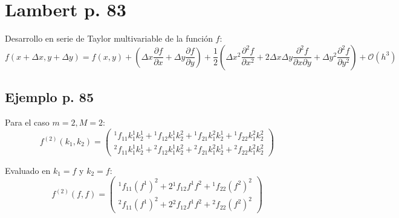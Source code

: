 \newpage

\section*{Lambert p. 83}

Desarrollo en serie de Taylor multivariable de la función $f$:
$$ f(x+\Delta x, y+\Delta y) = f(x,y) + \left(\Delta x \frac{\partial f}{\partial x} + \Delta y \frac{\partial f}{\partial y}\right) + \frac{1}{2}\left(\Delta x^2 \frac{\partial^2 f}{\partial x^2} + 2\Delta x \Delta y \frac{\partial^2 f}{\partial x \partial y} + \Delta y^2 \frac{\partial^2 f}{\partial y^2}\right) + \mathcal{O}(h^3) $$

\subsection*{Ejemplo p. 85}
Para el caso $m=2, M=2$:
$$ f^{(2)}(k_1, k_2) = \begin{pmatrix} 
    {^1}f_{11} k_1^1 k_2^1 + {^1}f_{12} k_1^1 k_2^2 + {^1}f_{21} k_1^2 k_2^1 + {^1}f_{22} k_1^2 k_2^2 \\ 
    {^2}f_{11} k_1^1 k_2^1 + {^2}f_{12} k_1^1 k_2^2 + {^2}f_{21} k_1^2 k_2^1 + {^2}f_{22} k_1^2 k_2^2 
\end{pmatrix} $$

Evaluado en $k_1 = f$ y $k_2 = f$:
$$ f^{(2)}(f, f) = \begin{pmatrix} 
    {^1}f_{11} (f^1)^2 + 2{^1}f_{12} f^1 f^2 + {^1}f_{22} (f^2)^2 \\ 
    {^2}f_{11} (f^1)^2 + 2{^2}f_{12} f^1 f^2 + {^2}f_{22} (f^2)^2 
\end{pmatrix} $$

